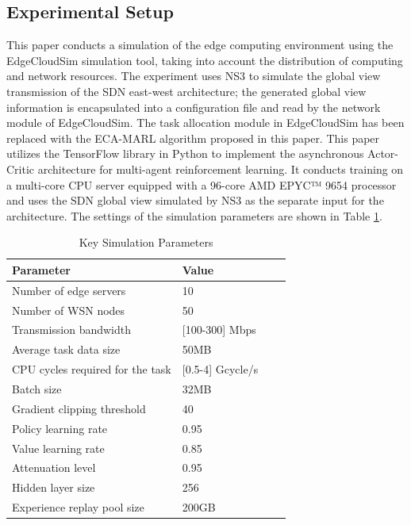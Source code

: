 \subsection{Experimental Setup}\label{subsec5.1}

This paper conducts a simulation of the edge computing environment using the EdgeCloudSim simulation tool\cite{ref34}, taking into account the distribution of computing and network resources. The experiment uses NS3 to simulate the global view transmission of the SDN east-west architecture; the generated global view information is encapsulated into a configuration file and read by the network module of EdgeCloudSim. The task allocation module in EdgeCloudSim has been replaced with the ECA-MARL algorithm proposed in this paper. This paper utilizes the TensorFlow library in Python to implement the asynchronous Actor-Critic architecture for multi-agent reinforcement learning. It conducts training on a multi-core CPU server equipped with a 96-core AMD EPYC™ 9654 processor and uses the SDN global view simulated by NS3 as the separate input for the architecture. The settings of the simulation parameters are shown in Table \ref{tab1}.

\begin{table}
\begin{center}
\caption{Key Simulation Parameters}
\label{tab1}
\begin{tabular}{@{~~}llll@{}}
\toprule
Parameter & Value\\
\midrule
Number of edge servers & 10\\
Number of WSN nodes & 50\\
Transmission bandwidth & [100-300] Mbps\\
Average task data size & 50MB\\
CPU cycles required for the task & [0.5-4] Gcycle/s\\
Batch size & 32MB\\
Gradient clipping threshold & 40\\
Policy learning rate & 0.95\\
Value learning rate & 0.85\\
Attenuation level & 0.95\\
Hidden layer size & 256\\
Experience replay pool size & 200GB\\
\bottomrule
\end{tabular}
\end{center}
\end{table}

